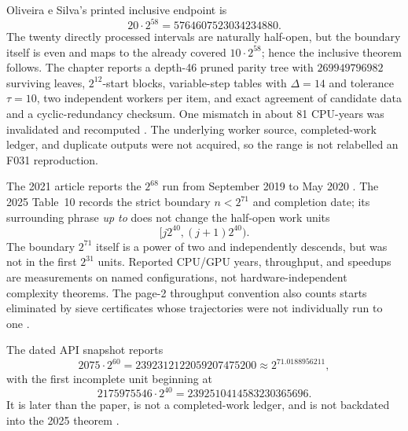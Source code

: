Oliveira e Silva's printed inclusive endpoint is
\[
 20\cdot2^{58}=5764607523034234880.
\]
The twenty directly processed intervals are naturally half-open, but the
boundary itself is even and maps to the already covered $10\cdot2^{58}$;
hence the inclusive theorem follows.  The chapter reports a depth-46 pruned
parity tree with $269949796982$ surviving leaves, $2^{12}$-start blocks,
variable-step tables with $\Delta=14$ and tolerance $\tau=10$, two
independent workers per item, and exact agreement of candidate data and a
cyclic-redundancy checksum.  One mismatch in about 81 CPU-years was
invalidated and recomputed \cite[pp.~189--198]{OliveiraSilva2010}.  The
underlying worker source, completed-work ledger, and duplicate outputs were
not acquired, so the range is not relabelled an F031 reproduction.

The 2021 article reports the $2^{68}$ run from September 2019 to May 2020
\cite[p.~7]{Barina2021}.  The 2025 Table~10 records the strict boundary
$n<2^{71}$ and completion date; its surrounding phrase \emph{up to} does not
change the half-open work units
\[
 [j2^{40},(j+1)2^{40}).
\]
The boundary $2^{71}$ itself is a power of two and independently descends,
but was not in the first $2^{31}$ units.  Reported CPU/GPU years, throughput,
and speedups are measurements on named configurations, not
hardware-independent complexity theorems.  The page-2 throughput convention
also counts starts eliminated by sieve certificates whose trajectories were
not individually run to one \cite{Barina2025}.

The dated API snapshot reports
\[
 2075\cdot2^{60}=2392312122059207475200
 \approx2^{71.0188956211},
\]
with the first incomplete unit beginning at
\[
 2175975546\cdot2^{40}=2392510414583230365696.
\]
It is later than the paper, is not a completed-work ledger, and is not
backdated into the 2025 theorem \cite{BarinaStatus2026}.

